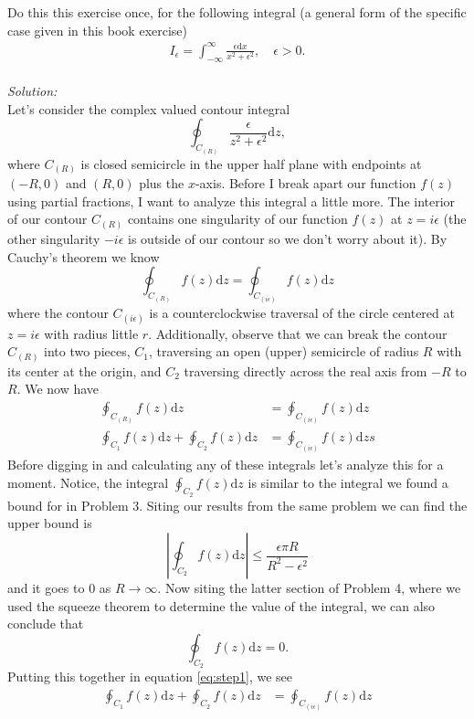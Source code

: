 \documentclass[10pt]{amsart}
\newcommand{\D}{\mathrm{d}}
\theoremstyle{nonumberplain}
\begin{document}
\begin{enumerate}[label={\bf {\arabic*}:}]
\noindent
Do this this exercise once, for the following integral (a general form of the specific case given in this book exercise)
  \begin{align*}
    I_\epsilon = \int_{-\infty}^\infty \frac{\epsilon \D x}{x^2 +
    \epsilon^2}, \quad \epsilon > 0.
  \end{align*}\\
\textit{Solution:} \\
Let's consider the complex valued contour integral
$$\oint_{C_{(R)}} \frac{\epsilon}{z^2 + \epsilon^2} \D z,$$
where $C_{(R)}$ is closed semicircle in the upper half plane with endpoints at $(-R, 0)$ and $(R, 0)$ plus the $x$-axis.
Before I break apart our function $f(z)$ using partial fractions, I want to analyze this integral a little more.
The interior of our contour $C_{(R)}$ contains one singularity of our function $f(z)$ at $z = i\epsilon$ (the other singularity $-i\epsilon$ is outside of our contour so we don't worry about it).
By Cauchy's theorem we know
$$
\oint_{C_{(R)}} f(z) \D z = \oint_{C_{(i\epsilon)}} f(z) \D z
$$
where the contour $C_{(i\epsilon)}$ is a counterclockwise traversal of the circle centered at $z = i\epsilon$ with radius little $r$.
Additionally, observe that we can break the contour $C_{(R)}$ into two pieces, $C_1$, traversing an open (upper) semicircle of radius $R$ with its center at the origin, and $C_2$ traversing directly across the real axis from $-R$ to $R$. We now have
\begin{align}
\oint_{C_{(R)}} f(z) \D z &= \oint_{C_{(i\epsilon)}} f(z) \D z \nonumber \\
\oint_{C_1} f(z) \D z + \oint_{C_2} f(z) \D z &= \oint_{C_{(i\epsilon)}} f(z) \D zs
\label{eq:step1}
\end{align}
Before digging in and calculating any of these integrals let's analyze this for a moment.
Notice, the integral $\oint_{C_2} f(z) \D z$ is similar to the integral we found a bound for in Problem 3.
Siting our results from the same problem we can find the upper bound is
$$\left| \oint_{C_2} f(z) \D z\right| \leq \frac{\epsilon \pi R}{R^2 - \epsilon^2}$$
and it goes to $0$ as $R \rightarrow \infty$.
Now siting the latter section of Problem 4, where we used the squeeze theorem to determine the value of the integral, we can also conclude that
$$
\oint_{C_2} f(z) \D z = 0.
$$
Putting this together in equation \eqref{eq:step1}, we see
\begin{align}
\oint_{C_1} f(z) \D z + \oint_{C_2} f(z) \D z &= \oint_{C_{(i\epsilon)}} f(z) \D z \nonumber \\

\end{align}
\end{enumerate}
\end{document}
